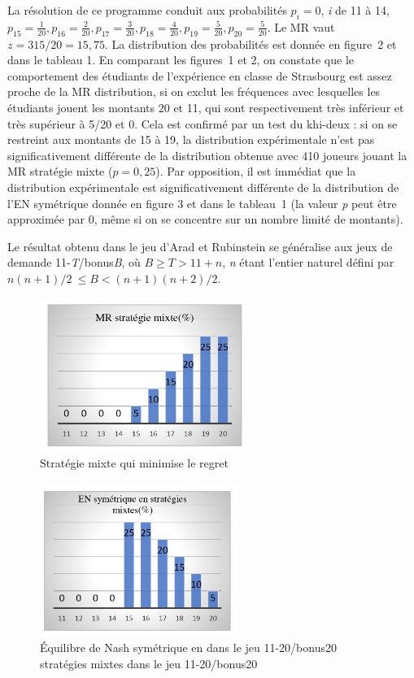 \begin{Article}
\begin{refsection}[UmbhauerFR]
La résolution de ce programme conduit aux probabilités \(p_{i} = 0\), \emph{i}
de 11 à 14, $p_{15} = \frac{1}{20}, p_{16} = \frac{2}{20}, p_{17} = \frac{3}{20}, p_{18} = \frac{4}{20}, p_{19} = \frac{5}{20}, p_{20} = \frac{5}{20}$.
Le MR vaut $z=315/20=15,75$. La distribution des probabilités est
donnée en figure~2 et dans le tableau 1. En comparant les figures~1 et
2, on constate que le comportement des étudiants de l'expérience en
classe de Strasbourg est assez proche de la MR distribution, si on
exclut les fréquences avec lesquelles les étudiants jouent les montants
20 et 11, qui sont respectivement très inférieur et très supérieur à
5/20 et 0. Cela est confirmé par un test du khi-deux : si on se
restreint aux montants de 15 à 19, la distribution expérimentale n'est
pas significativement différente de la distribution obtenue avec 410
joueurs jouant la MR stratégie mixte ($p = 0,25$). Par opposition, il
est immédiat que la distribution expérimentale est significativement
différente de la distribution de l'EN symétrique donnée en figure 3 et
dans le tableau~1 (la valeur \emph{p} peut être approximée par 0, même
si on se concentre sur un nombre limité de montants).

Le résultat obtenu dans le jeu d'Arad et Rubinstein se généralise aux
jeux de demande 11-\emph{T}/bonus\emph{B}, où \(B \geq T > 11 + n\),
\emph{n} étant l'entier naturel défini par
\(n(n + 1)/2\  \leq B < (n + 1)(n + 2)/2\).

\newpage

\begin{figure}[h]
    \centering
    \caption{Stratégie mixte qui minimise le regret}
    \includegraphics[height=5cm]{Articles-bons-a-composer/02_Umbhauer/02_Umbhauer_fr_Figures/02_Umbhauer_fr_figure-2.jpeg}
\end{figure}

\begin{figure}[h]
    \centering
    \caption{Équilibre de Nash symétrique en dans le jeu 11-20/bonus20 stratégies
mixtes dans le jeu 11-20/bonus20}
    \includegraphics[height=5cm]{Articles-bons-a-composer/02_Umbhauer/02_Umbhauer_fr_Figures/02_Umbhauer_fr_figure-3.jpeg}
\end{figure}


\end{refsection}
\end{Article}
